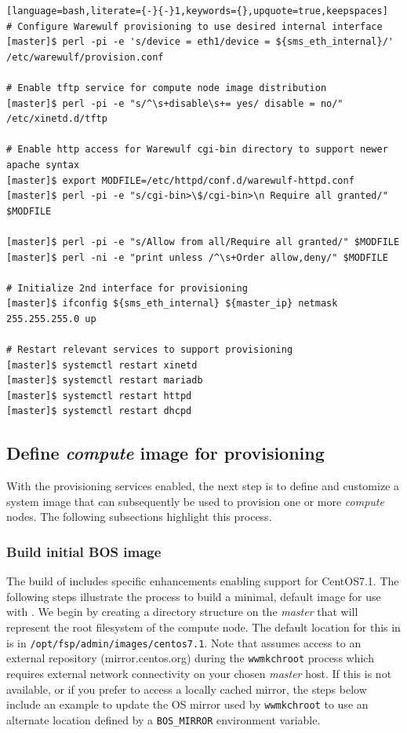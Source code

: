 \documentclass[letterpaper]{article}
\newcommand{\baseOS}{CentOS7.1}
\begin{document}
\begin{lstlisting}[language=bash,literate={-}{-}1,keywords={},upquote=true,keepspaces]
# Configure Warewulf provisioning to use desired internal interface
[master]$ perl -pi -e 's/device = eth1/device = ${sms_eth_internal}/' /etc/warewulf/provision.conf

# Enable tftp service for compute node image distribution
[master]$ perl -pi -e "s/^\s+disable\s+= yes/ disable = no/" /etc/xinetd.d/tftp

# Enable http access for Warewulf cgi-bin directory to support newer apache syntax
[master]$ export MODFILE=/etc/httpd/conf.d/warewulf-httpd.conf
[master]$ perl -pi -e "s/cgi-bin>\$/cgi-bin>\n Require all granted/" $MODFILE

[master]$ perl -pi -e "s/Allow from all/Require all granted/" $MODFILE
[master]$ perl -ni -e "print unless /^\s+Order allow,deny/" $MODFILE

# Initialize 2nd interface for provisioning
[master]$ ifconfig ${sms_eth_internal} ${master_ip} netmask 255.255.255.0 up

# Restart relevant services to support provisioning
[master]$ systemctl restart xinetd  
[master]$ systemctl restart mariadb 
[master]$ systemctl restart httpd   
[master]$ systemctl restart dhcpd
\end{lstlisting}


\subsection{Define {\em compute} image for provisioning}

With the provisioning services enabled, the next step is to define and
customize a system image that can subsequently be used to provision one or more
{\em compute} nodes. The following subsections highlight this process.

\subsubsection{Build initial BOS image} \label{sec:assemble_bos}

The \FSP{} build of \Warewulf{} includes specific enhancements enabling support for
\baseOS{}. The following steps illustrate the process to build a minimal, default
image for use with \Warewulf{}.  We begin by creating a directory structure on the 
{\em master} that will represent the root filesystem of the compute node. The 
default location for this in \FSP{} is in
\texttt{/opt/fsp/admin/images/centos7.1}. Note that \Warewulf{} assumes access to
an external repository (mirror.centos.org) during the \texttt{wwmkchroot}
process which requires external network connectivity on your chosen {\em
  master} host. If this is not available, or if you prefer to access a locally cached
mirror, the steps below include an example to update the OS mirror used by
\texttt{wwmkchroot} to use an alternate location defined by a
\texttt{BOS\_MIRROR} environment variable.
\end{document}
